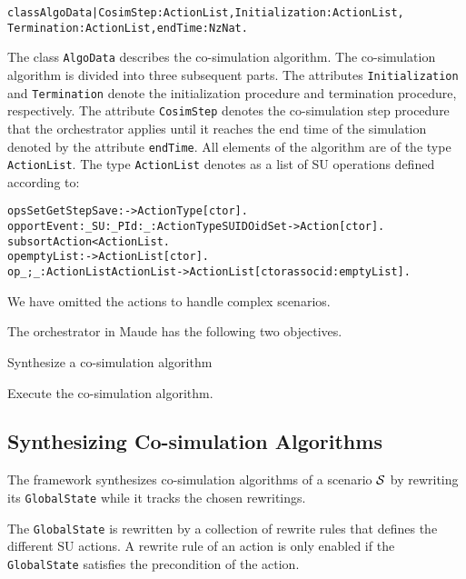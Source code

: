 \small
\begin{alltt}
class AlgoData | CosimStep : ActionList,   Initialization : ActionList, 
                 Termination : ActionList, endTime : NzNat .
\end{alltt}
\normalsize
The class \texttt{AlgoData} describes the co-simulation algorithm.
The co-simulation algorithm is divided into three subsequent parts.
The attributes \texttt{Initialization} and \texttt{Termination} denote the initialization procedure and termination procedure, respectively.
The attribute \texttt{CosimStep} denotes the co-simulation step procedure that the orchestrator applies until it reaches the end time of the simulation denoted by the attribute \texttt{endTime}.
All elements of the algorithm are of the type \texttt{ActionList}.
The type \texttt{ActionList} denotes as a list of SU operations defined according to:
\small
\begin{alltt}
ops Set Get Step Save : -> ActionType [ctor] . 
op portEvent:_SU:_PId:_ : ActionType SUID OidSet -> Action [ctor] .
subsort Action < ActionList .
op emptyList : -> ActionList [ctor] .
op _;_ : ActionList ActionList -> ActionList [ctor assoc id: emptyList] .
\end{alltt}
\normalfont
We have omitted the actions to handle complex scenarios.

The orchestrator in Maude has the following two objectives.
\begin{compactenum}
  \item Synthesize a co-simulation algorithm
  \item Execute the co-simulation algorithm.
\end{compactenum}

\subsection{Synthesizing Co-simulation Algorithms}
The framework synthesizes co-simulation algorithms of a scenario $\mathcal{S}$ by rewriting its \texttt{GlobalState} while it tracks the chosen rewritings.

The \texttt{GlobalState} is rewritten by a collection of rewrite rules that defines the different SU actions.
A rewrite rule of an action is only enabled if the \texttt{GlobalState} satisfies the precondition of the action.

